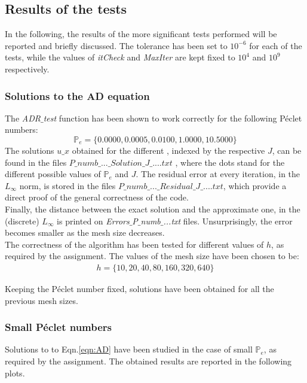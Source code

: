 \documentclass[11pt]{article}
\theoremstyle{theorem}
\theoremstyle{definition}
\begin{document}
\subsection{Results of the tests}
In the following, the results of the more significant tests performed will be reported and briefly discussed. The tolerance has been set to $10^{-6}$ for each of the tests, while the values of \emph{itCheck} and \emph{MaxIter} are kept fixed to $10^4$ and $10^9$ respectively.\\

\subsubsection{Solutions to the AD equation}
The \emph{ADR$\_$test} function has been shown to work correctly for the following  P\'{e}clet numbers:
$$\mathbb{P}_e=\lbrace 0.0000, 0.0005, 0.0100, 1.0000, 10.5000 \rbrace$$
The solutions $u\_x$ obtained for the different , indexed by the respective $J$, can be found in the files $P\_numb\_...\_Solution\_J\_....txt$ , where the dots stand for the different possible values of $\mathbb{P}_e$ and $J$. The residual error at every iteration, in the $L_\infty$ norm, is stored in the files $P\_numb\_...\_Residual\_J\_....txt$, which provide a direct proof of the general correctness of the code.\\
Finally, the distance between the exact solution and the approximate one, in the (discrete) $L_\infty$ is printed on \emph{Errors$\_$P$\_$numb$\_$...txt} files. Unsurprisingly, the error becomes smaller as the mesh size decreases.\\
The correctness of the algorithm has been tested for different values of $h$, as required by the assignment. The values of the mesh size have been chosen to be:
\begin{align}
	\label{eqn:h-choice}
	h=\lbrace10, 20, 40, 80, 160, 320, 640\rbrace
\end{align}

Keeping the P\'{e}clet number fixed, solutions have been obtained for all the previous mesh sizes.\\ 


\subsubsection{Small P\'{e}clet numbers}
Solutions to to Eqn.\eqref{eqn:AD} have been studied in the case of small $\mathbb{P}_e$, as required by the assignment. The obtained results are reported in the following plots.
\end{document}
